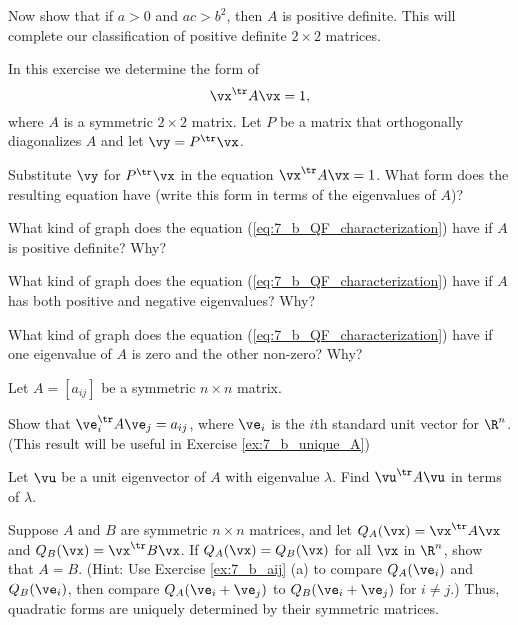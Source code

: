 	\item Now show that if $a > 0$ and $ac > b^2$, then $A$ is positive definite. This will complete our classification of positive definite $2 \times 2$ matrices.  


	\ea


\item \label{ex:7_b_QF_characterization} In this exercise we determine the form of
\begin{equation} \label{eq:7_b_QF_characterization}
\vx^{\tr}A\vx=1,
\end{equation}
where $A$ is a symmetric $2 \times 2$ matrix. Let $P$ be a matrix that orthogonally diagonalizes $A$ and let $\vy = P^{\tr}\vx$.
    \ba
    \item Substitute $\vy$ for $P^{\tr}\vx$ in the equation $\vx^{\tr}A\vx = 1$. What form does the resulting equation have (write this form in terms of the eigenvalues of $A$)?


    \item What kind of graph does the equation (\ref{eq:7_b_QF_characterization}) have if $A$ is positive definite? Why?

    \item What kind of graph does the equation (\ref{eq:7_b_QF_characterization}) have if $A$ has both positive and negative eigenvalues? Why?
    
    \item What kind of graph does the equation (\ref{eq:7_b_QF_characterization}) have if one eigenvalue of $A$ is zero and the other non-zero? Why?

    \ea

\item \label{ex:7_b_aij} Let $A = [a_{ij}]$ be a symmetric $n \times n$ matrix. 
	\ba
	\item Show that $\ve_i^{\tr}A\ve_j = a_{ij}$, where $\ve_i$ is the $i$th standard unit vector for $\R^n$. (This result will be useful in Exercise \ref{ex:7_b_unique_A})

	\item Let $\vu$ be a unit eigenvector of $A$ with eigenvalue $\lambda$. Find $\vu^{\tr}A\vu$ in terms of $\lambda$.  


	\ea
	


\item \label{ex:7_b_unique_A} Suppose $A$ and $B$ are symmetric $n \times n$ matrices, and let $Q_A(\vx) = \vx^{\tr}A\vx$ and $Q_B(\vx) = \vx^{\tr} B\vx$. If $Q_A(\vx) = Q_B(\vx)$ for all $\vx$ in $\R^n$, show that $A=B$.  (Hint: Use Exercise \ref{ex:7_b_aij} (a) to compare $Q_A(\ve_i)$ and $Q_B(\ve_i)$, then compare $Q_A(\ve_i+\ve_j)$ to $Q_B(\ve_i + \ve_j)$ for $i \neq j$.) Thus, quadratic forms are uniquely determined by their symmetric matrices. 


